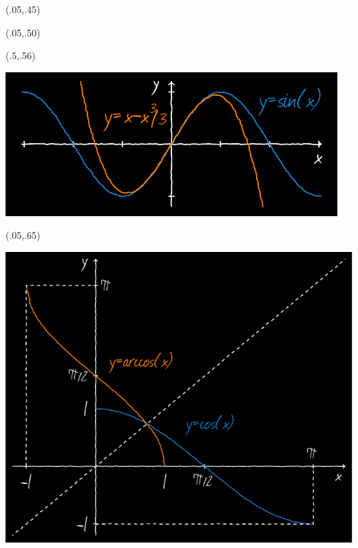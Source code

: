 \documentclass[a4paper]{book}
\begin{document}
\begin{textblock}{.9}(.05,.45)
    \begin{flushright}
        \noindent {\fontsize{20.74}{2}\selectfont
            \bfseries\textcolor{orange!66!red}{Version 3.14}}
    \end{flushright}
\end{textblock}

\begin{textblock}{.9}(.05,.50)
    \begin{flushright}
        \noindent {\fontsize{15}{2}\selectfont
            \bfseries\textcolor{yellow!80!cyan}{Under the LPPL, version 1.3c}}
    \end{flushright}
\end{textblock}

\begin{textblock}{.45}(.5,.56)
    \begin{center}
        \includegraphics[width=.45\paperwidth]{dlsin}
    \end{center}
\end{textblock}

\begin{textblock}{.4}(.05,.65)
    \begin{center}
        \includegraphics[width=.4\paperwidth]{arccos}
    \end{center}
\end{textblock}
\end{document}

